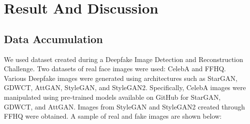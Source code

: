 \chapter{Result And Discussion}
	\section{Data Accumulation}
		We used dataset created during a Deepfake Image Detection and Reconstruction
		Challenge. Two datasets of real face images were used: CelebA and FFHQ. Various
		Deepfake images were generated using architectures such as StarGAN, GDWCT,
		AttGAN, StyleGAN, and StyleGAN2. Specifically, CelebA images were manipulated
		using pre-trained models available on GitHub for StarGAN, GDWCT, and AttGAN.
		Images from StyleGAN and StyleGAN2 created through FFHQ were obtained. A sample of real and fake images are shown below:


